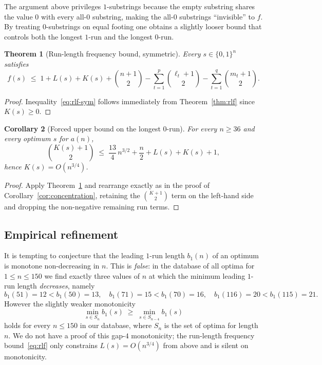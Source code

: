 ﻿\documentclass[11pt,a4paper]{article}
\theoremstyle{plain}
\newtheorem{theorem}{Theorem}
\newtheorem{corollary}[theorem]{Corollary}
\theoremstyle{definition}
\theoremstyle{remark}
\begin{document}
The argument above privileges $1$-substrings because the empty
substring shares the value $0$ with every all-$0$ substring,
making the all-$0$ substrings ``invisible'' to $f$.  By treating
$0$-substrings on equal footing one obtains a slightly looser
bound that controls both the longest $1$-run and the longest
$0$-run.

\begin{theorem}[Run-length frequency bound, symmetric]\label{thm:rlf-sym}
Every $s\in\{0,1\}^n$ satisfies
\begin{equation}\label{eq:rlf-sym}
  f(s)\;\le\;1+L(s)+K(s)+\binom{n+1}{2}
        -\sum_{t=1}^{p}\binom{\ell_t+1}{2}
        -\sum_{t=1}^{q}\binom{m_t+1}{2}.
\end{equation}
\end{theorem}

\begin{proof}
Inequality~\eqref{eq:rlf-sym} follows immediately from
Theorem~\ref{thm:rlf} since $K(s)\ge 0$.
\end{proof}

\begin{corollary}[Forced upper bound on the longest $0$-run]\label{cor:Kbound}
For every $n\ge 36$ and every optimum $s$ for $a(n)$,
\[
  \binom{K(s)+1}{2}
  \;\le\;\frac{13}{4}\,n^{3/2}+\frac{n}{2}+L(s)+K(s)+1,
\]
hence $K(s)=O(n^{3/4})$.
\end{corollary}

\begin{proof}
Apply Theorem~\ref{thm:rlf-sym} and rearrange exactly as in the
proof of Corollary~\ref{cor:concentration}, retaining the
$\binom{K+1}{2}$ term on the left-hand side and dropping the
non-negative remaining run terms.
\end{proof}

\subsection{Empirical refinement}

It is tempting to conjecture that the leading $1$-run length $b_1(n)$
of an optimum is monotone non-decreasing in $n$.  This is
\emph{false}: in the database of all optima for $1\le n\le 150$ we
find exactly three values of $n$ at which the minimum leading
$1$-run length \emph{decreases}, namely
\[
  b_1(51)=12<b_1(50)=13,\quad
  b_1(71)=15<b_1(70)=16,\quad
  b_1(116)=20<b_1(115)=21.
\]
However the slightly weaker monotonicity
\[
  \min_{s\in S_n}b_1(s)\;\ge\;\min_{s\in S_{n-4}}b_1(s)
\]
holds for every $n\le 150$ in our database, where $S_n$ is the set of
optima for length~$n$.  We do not have a proof of this gap-$4$
monotonicity; the run-length frequency
bound~\eqref{eq:rlf} only constrains $L(s)=O(n^{3/4})$ from above
and is silent on monotonicity.
\end{document}
